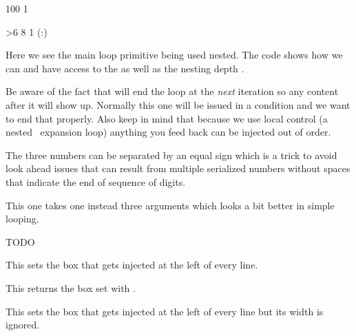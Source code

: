 \startbuffer
{} 100 1 {%
    \ifnum\currentloopiterator>6\relax
        \quitloop
    \else
        [\number\currentloopnesting:\number\currentloopiterator]
         8 1 {%
            (\number\currentloopnesting:\number\currentloopiterator)
        }\par
    \fi
}
\stopbuffer

\typebuffer

Here we see the main loop primitive being used nested. The code shows how we can
 and have access to the  as well as the
nesting depth .

\startpacked \getbuffer \stoppacked

Be aware of the fact that  will end the loop at the {\em next}
iteration so any content after it will show up. Normally this one will be issued
in a condition and we want to end that properly. Also keep in mind that because
we use local control (a nested \TEX\ expansion loop) anything you feed back can
be injected out of order.

The three numbers can be separated by an equal sign which is a trick to avoid
look ahead issues that can result from multiple serialized numbers without spaces
that indicate the end of sequence of digits.

\stopnewprimitive

\startnewprimitive[title={\prm {localcontrolledrepeat}}]

This one takes one instead three arguments which looks a bit better
in simple looping.

\stopnewprimitive

\startnewprimitive[title={\prm {localinterlinepenalty}}]
    TODO
\stopnewprimitive

\startnewprimitive[title={\prm {localleftbox}}]

This sets the box that gets injected at the left of every line.

\stopnewprimitive

\startnewprimitive[title={\prm {localleftboxbox}}]

This returns the box set with .

\stopnewprimitive

\startnewprimitive[title={\prm {localmiddlebox}}]

This sets the box that gets injected at the left of every line but its width
is ignored.

\stopnewprimitive

